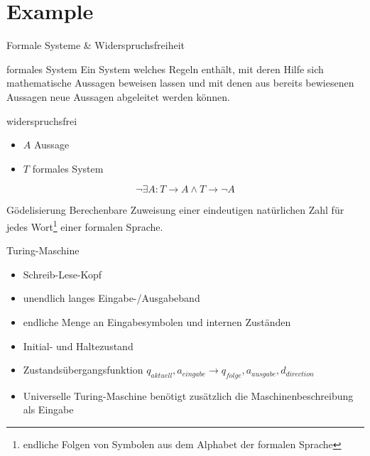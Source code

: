 \section{Example}

\begin{frame}{Formale Systeme \& Widerspruchsfreiheit}
    \begin{block}{formales System}
        Ein System welches Regeln enthält, mit deren Hilfe sich mathematische Aussagen beweisen lassen und mit denen aus bereits bewiesenen Aussagen neue Aussagen abgeleitet werden können.
    \end{block}
    \begin{block}{widerspruchsfrei}
        \begin{itemize}
            \item $A$ Aussage
            \item $T$ formales System
        \end{itemize}
        $$\neg\exists A: T\rightarrow{}A \wedge T\rightarrow{}\neg{}A $$
    \end{block}
\end{frame}

\begin{frame}[squeeze]
    \begin{block}{Gödelisierung}
        Berechenbare Zuweisung einer eindeutigen natürlichen Zahl für jedes Wort\footnote{endliche Folgen von Symbolen aus dem Alphabet der formalen Sprache} einer formalen Sprache.
    \end{block}
    \begin{block}{Turing-Maschine}
        \begin{itemize}
            \item Schreib-Lese-Kopf
            \item unendlich langes Eingabe-/Ausgabeband
            \item endliche Menge an Eingabesymbolen und internen Zuständen
            \item Initial- und Haltezustand
            \item Zustandsübergangsfunktion $q_{aktuell}, a_{eingabe} \rightarrow{} q_{folge}, a_{ausgabe}, d_{direction}$
            \item Universelle Turing-Maschine benötigt zusätzlich die Maschinenbeschreibung als Eingabe
        \end{itemize}
    \end{block}
\end{frame}

